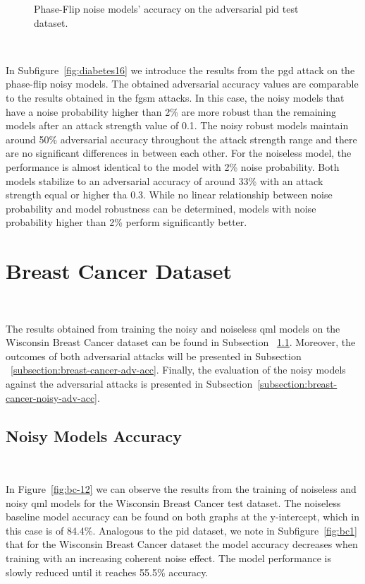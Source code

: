 \begin{figure}[!h]
  \caption{Phase-Flip noise models' accuracy on the adversarial \ac{pid} test dataset.}
  \label{fig:diabetes-1516}
\end{figure} \

In Subfigure~\ref{fig:diabetes16} we introduce the results from the \ac{pgd}
attack on the phase-flip noisy models. The obtained adversarial accuracy
values are comparable to the results obtained in the \ac{fgsm} attacks.
In this case, the noisy models that have a noise probability higher than
2\% are more robust than the remaining models after an attack
strength value of 0.1. The noisy robust models maintain around 50\%
adversarial accuracy throughout the attack strength range and there
are no significant differences in between each other. For the noiseless
model, the performance is almost identical to the model with 2\% noise
probability. Both models stabilize to an adversarial accuracy of around
33\% with an attack strength equal or higher tha 0.3. While no linear
relationship between noise probability and model robustness can be
determined, models with noise probability higher than 2\% perform
significantly better. \

\section{Breast Cancer Dataset}\label{section:breast-cancer-eval} \

The results obtained from training the noisy and noiseless
\ac{qml} models on the Wisconsin Breast Cancer dataset can be found in Subsection
~\ref{subsection:breast-cancer-noisy-acc}. Moreover, the outcomes
of both adversarial attacks will be presented in Subsection
~\ref{subsection:breast-cancer-adv-acc}. Finally, the evaluation
of the noisy models against the adversarial attacks is
presented in Subsection~\ref{subsection:breast-cancer-noisy-adv-acc}. \

\subsection{Noisy Models Accuracy}\label{subsection:breast-cancer-noisy-acc} \

In Figure~\ref{fig:bc-12} we can observe the results
from the training of noiseless and noisy \ac{qml} models
for the Wisconsin Breast Cancer test dataset. The noiseless baseline model accuracy
can be found on both graphs at the y-intercept, which in
this case is of 84.4\%. Analogous to the \ac{pid} dataset, we note
in Subfigure~\ref{fig:bc1} that for the Wisconsin Breast Cancer
dataset the model accuracy decreases when training
with an increasing coherent noise effect. The model performance
is slowly reduced until it reaches 55.5\% accuracy. \

